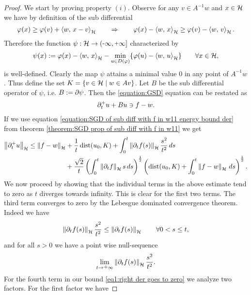 \begin{proof}
	We start by proving property $ (i) $.
	Observe for any $ v\in A^{-1}w $ and $ x\in\mathcal{H} $ we have
	by definition of the sub differential
	\begin{align*}
		\varphi(x)\geq \varphi(v)+\left\langle w,\,x-v\right\rangle_{\mathcal{H}}
		\qquad\Rightarrow\qquad 
		\varphi(x)-\left\langle w,\,x\right\rangle_{\mathcal{H}}\geq \varphi(v)-\left\langle w,\,v\right\rangle_{\mathcal{H}}.
	\end{align*}
	Therefore the function $ \psi:\rH\ra(\minus\infty,\plus\infty] $ characterized by
	\begin{align*}
		\psi(x):=\varphi(x)-\left\langle w,\,x\right\rangle_{\mathcal{H}}-\min_{u\in D(\varphi)}\{\varphi(u)-\left\langle w,\,u\right\rangle_{\mathcal{H}}\}
		\qquad\forall x\in \mathcal{H},
	\end{align*}
	is well-defined.
	Clearly the map $ \psi $ attains a minimal value $ 0 $
	in any point of $ A^{-1}w $.
	Thus define the set $ K=\{v\in\mathcal{H}\;\vert\; w\in Av\} $.
	Let $ B $ be the sub differential operator of $ \psi $,
	i.e. $ B:=\partial\psi $. Then the \ref{equation:GSD}
	equation can be restated as
	\begin{align*}
		\partial_t^+ u+Bu\ni f-w.
	\end{align*}
	If we use equation 
	\eqref{equation:SGD of sub diff with f in w11 energy bound der}
	from theorem \ref{theorem:SGD prop of sub diff with f in w11}
	we get
	\begin{align}\label{eq1:right der goes to zero}
		\begin{split}
			\left\Vert \partial_t^+ u\right\Vert_{\mathcal{H}}
			\leq \left\Vert f-w\right\Vert_{\mathcal{H}}
			&+\frac{1}{t}\operatorname{\mathrm{dist}}(u_0, K)
			+\int_0^t\left\Vert \partial_t f(s)\right\Vert_{\mathcal{H}}\frac{s^2}{t^2}\,ds\\
			&+\frac{\sqrt{2}}{t}
			\left(\int_0^t\left\Vert \partial_t f\right\Vert_{\mathcal{H}} s\,ds\right)^{\frac{1}{2}}
			\left(\operatorname{\mathrm{dist}}(u_0,K)+\int_0^t\left\Vert f-w\right\Vert_{\mathcal{H}}\,ds\right)^{\frac{1}{2}}.
		\end{split}
	\end{align}
	We now proceed by showing that the individual terms in the above estimate
	tend to zero as $ t $ diverges towards infinity. This is clear for the
	first two terms. The third term converges to zero by the Lebesgue dominated convergence theorem.
	Indeed we have
	\begin{align*}
		\left\Vert \partial_t f(s)\right\Vert_{\mathcal{H}}\frac{s^2}{t^2}\leq \left\Vert \partial_t f(s)\right\Vert_{\mathcal{H}}
		\qquad\forall 0<s\leq t,
	\end{align*}
	and for all $ s>0 $ we have a point wise null-sequence
	\begin{align*}
		\lim_{t\ra\plus\infty}\norm{\prt_t f(s)}\frac{s^2}{t^2}.
	\end{align*}
	For the fourth term in our bound \eqref{eq1:right der goes to zero}
	we analyze two factors. For the first factor we have 

\end{proof}
